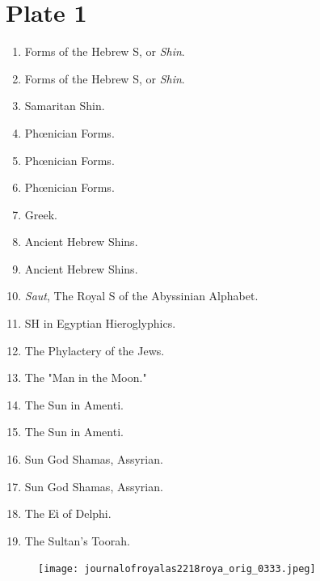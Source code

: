 \documentclass[a4paper, 11pt, oneside, english, landscape, twocolumn]{article}
\begin{document}
\section*{Plate 1}
\begin{enumerate}
    \item Forms of the Hebrew S, or \emph{Shin}.

    \item Forms of the Hebrew S, or \emph{Shin}.

    \item Samaritan Shin.

    \item Phœnician Forms.

    \item Phœnician Forms.

    \item Phœnician Forms.

    \item Greek.

    \item Ancient Hebrew Shins.

    \item Ancient Hebrew Shins.

    \item \emph{Saut}, The Royal S of the Abyssinian Alphabet.

    \item SH in Egyptian Hieroglyphics.

    \item The Phylactery of the Jews.

    \item The "Man in the Moon."

    \item The Sun in Amenti.

    \item The Sun in Amenti.

    \item Sun God Shamas, Assyrian.

    \item Sun God Shamas, Assyrian.

    \item The Εὶ of Delphi.

    \item The Sultan's Toorah.
\end{enumerate}
\vspace*{\fill}  
\clearpage
\vspace*{\fill}  
\begin{figure}[H]
\centering
\texttt{[image: journalofroyalas2218roya\_orig\_0333.jpeg]}
\end{figure}
\vspace*{\fill} 
\clearpage
\vspace*{\fill}  
\end{document}
